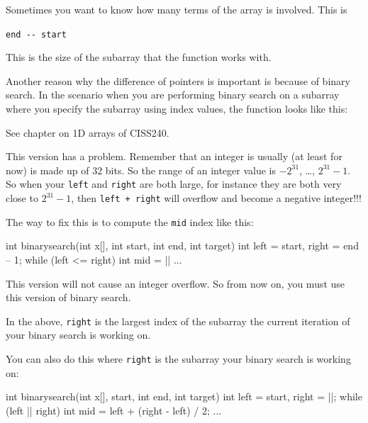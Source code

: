 Sometimes you want to know how many terms of the array is involved. This
is

\verb!end -- start!

This is the size of the subarray that the function works with.

Another reason why the difference of pointers is important is because of binary search. In the scenario when you are performing binary search on a subarray where you specify the subarray using index values, the function looks like this:

\begin{consolethree}[escapeinside=||]
int binarysearch(int x[], int start, int end,
                 int target)
{
    int left = start, right = end -- 1;
    while (left <= right)
    {
        int mid = (left + right) / 2};
        ...
    }
}
\end{consolethree}

See chapter on 1D arrays of CISS240.

This version has a problem. Remember that an integer is usually (at least for now) is made up of 32 bits. So the range of an integer value is $-2^{31}$, \ldots, $2^{31} - 1$. So when your \texttt{left} and \texttt{right} are both large, for instance they are both very close to $2^{31} - 1$, then \texttt{left + right} will overflow and become a negative integer!!!

The way to fix this is to compute the \texttt{mid} index like this:

\begin{consolethree}[escapeinside=||]
int binarysearch(int x[], int start, int end,
                 int target)
{
    int left = start, right = end -- 1;
    while (left <= right)
    {
        int mid = ||
        ...
    }
}
\end{consolethree}

This version will not cause an integer overflow. So from now on, you must use this version of binary search.

In the above, \texttt{right} is the largest index of the subarray the current iteration of your binary search is working on.

You can also do this where \texttt{right} is  the subarray your binary search is working on:

\begin{consolethree}[escapeinside=||]
int binarysearch(int x[], start, int end,
                 int target)
{
    int left = start, right = ||;
    while (left |\EMPHASIZE{ <}| right)
    {
        int mid = left + (right - left) / 2;
        ...
    }
}
\end{consolethree}

